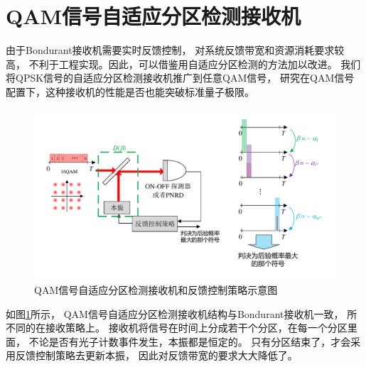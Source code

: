 \section{QAM信号自适应分区检测接收机}

由于Bondurant接收机需要实时反馈控制，
对系统反馈带宽和资源消耗要求较高，
不利于工程实现。因此，可以借鉴用自适应分区检测的方法加以改进。
我们将QPSK信号的自适应分区检测接收机推广到任意QAM信号，
研究在QAM信号配置下，这种接收机的性能是否也能突破标准量子极限。

\begin{figure}
\centering
  \includegraphics[width=\textwidth]{figures/chap3/QAM-ADP-receiver}
  \caption{QAM信号自适应分区检测接收机和反馈控制策略示意图}
  \label{fig:QAM-ADP-receiver}
\end{figure}

如图\ref{fig:QAM-ADP-receiver}所示，
QAM信号自适应分区检测接收机结构与Bondurant接收机一致，
所不同的在接收策略上。
接收机将信号在时间上分成若干个分区，在每一个分区里面，
不论是否有光子计数事件发生，本振都是恒定的。
只有分区结束了，才会采用反馈控制策略去更新本振，
因此对反馈带宽的要求大大降低了。


